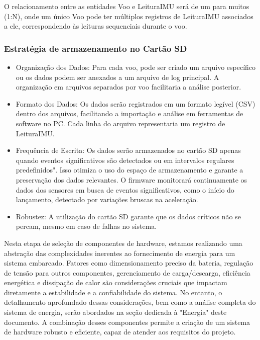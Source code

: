 O relacionamento entre as entidades Voo e LeituraIMU será de um para muitos (1:N), onde um único Voo pode ter múltiplos registros de LeituraIMU associados a ele, correspondendo às leituras sequenciais durante o voo.

\subsubsection{Estratégia de armazenamento no Cartão SD}
\begin{itemize}
    \item Organização dos Dados: Para cada voo, pode ser criado um arquivo específico ou os dados podem ser anexados a um arquivo de log principal. A organização em arquivos separados por voo facilitaria a análise posterior.
    \item Formato dos Dados: Os dados serão registrados em um formato legível (CSV) dentro dos arquivos, facilitando a importação e análise em ferramentas de software no PC. Cada linha do arquivo representaria um registro de LeituraIMU.
    \item Frequência de Escrita: Os dados serão armazenados no cartão SD apenas quando eventos significativos são detectados ou em intervalos regulares predefinidos". Isso otimiza o uso do espaço de armazenamento e garante a preservação dos dados relevantes. O firmware monitorará continuamente os dados dos sensores em busca de eventos significativos, como o início do lançamento, detectado por variações bruscas na aceleração.
    \item Robustez: A utilização do cartão SD garante que os dados críticos não se percam, mesmo em caso de falhas no sistema.
\end{itemize}
Nesta etapa de seleção de componentes de hardware, estamos realizando uma abstração das complexidades inerentes ao fornecimento de energia para um sistema embarcado. Fatores como dimensionamento preciso da bateria, regulação de tensão para outros componentes, gerenciamento de carga/descarga, eficiência energética e dissipação de calor são considerações cruciais que impactam diretamente a estabilidade e a confiabilidade do sistema. No entanto, o detalhamento aprofundado dessas considerações, bem como a análise completa do sistema de energia, serão abordados na seção dedicada à "Energia" deste documento.
A combinação desses componentes permite a criação de um sistema de hardware robusto e eficiente, capaz de atender aos requisitos do projeto.

